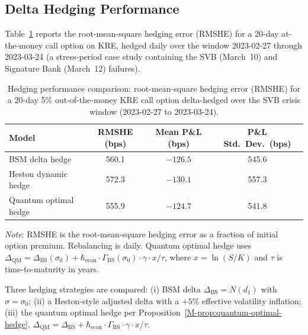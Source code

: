 \subsection{Delta Hedging Performance}\label{sec:hedging-performance}

Table~\ref{tab:hedging-rmshe} reports the root-mean-square hedging error
(RMSHE) for a 20-day at-the-money call option on KRE, hedged daily over the
window 2023-02-27 through 2023-03-24 (a stress-period case study containing
the SVB (March~10) and Signature Bank (March~12) failures).

\begin{table}[htbp]
\centering
\caption{Hedging performance comparison: root-mean-square hedging error (RMSHE)
for a 20-day 5\% out-of-the-money KRE call option delta-hedged over the SVB
crisis window (2023-02-27 to 2023-03-24).}
\label{tab:hedging-rmshe}
\small
\begin{tabular}{lccc}
\toprule
Model & RMSHE (bps) & Mean P\&L (bps) & P\&L Std.\ Dev.\ (bps) \\
\midrule
BSM delta hedge       & 560.1 & $-126.5$ & 545.6 \\
Heston dynamic hedge  & 572.3 & $-130.1$ & 557.3 \\
Quantum optimal hedge & 555.9 & $-124.7$ & 541.8 \\
\bottomrule
\end{tabular}
\par\smallskip\noindent\footnotesize
\textit{Note}: RMSHE is the root-mean-square hedging error as a fraction of
initial option premium. Rebalancing is daily. Quantum optimal hedge uses
$\Delta_{\mathrm{QM}} = \Delta_{\mathrm{BS}}(\sigma_0) + \hbar_{\mathrm{econ}}
\cdot \Gamma_{\mathrm{BS}}(\sigma_0) \cdot \gamma \cdot x/\tau$, where
$x = \ln(S/K)$ and $\tau$ is time-to-maturity in years.
\end{table}

Three hedging strategies are compared: (i) BSM delta $\Delta_{\text{BS}}
= N(d_1)$ with $\sigma = \sigma_0$; (ii) a Heston-style adjusted delta with
a $+5\%$ effective volatility inflation; (iii) the quantum optimal hedge per
Proposition~\ref{M-prop:quantum-optimal-hedge},
$\Delta_{\text{QM}} = \Delta_{\text{BS}} + \hbar_{\mathrm{econ}} \cdot
\Gamma_{\text{BS}} \cdot \gamma \cdot x/\tau$.

